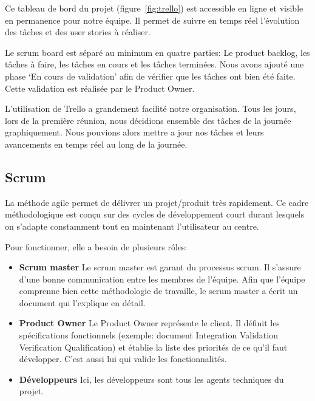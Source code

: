 Ce tableau de bord du projet (figure~\ref{fig:trello}) est accessible en ligne et visible en permanence pour notre équipe.
Il permet de suivre en temps réel l'évolution des tâches et des user stories à réaliser.

Le scrum board est séparé au minimum en quatre parties: Le product backlog, les tâches à faire, les tâches en cours et les tâches terminées.
Nous avons ajouté une phase `En cours de validation' afin de vérifier que les tâches ont bien été faite. 
Cette validation est réalisée par le Product Owner.

L'utilisation de Trello a grandement facilité notre organisation.
Tous les jours, lors de la première réunion, nous décidions ensemble des tâches de la journée graphiquement.
Nous pouvions alors mettre a jour nos tâches et leurs avancements en temps réel au long de la journée.

\subsection{Scrum}
La méthode agile permet de délivrer un projet/produit très rapidement.
Ce cadre méthodologique est conçu sur des cycles de développement court durant lesquels on s'adapte constamment tout en maintenant l'utilisateur au centre. 

Pour fonctionner, elle a besoin de plusieurs rôles:
\begin{itemize}
    \item \textbf{Scrum master}\newline
    Le scrum master est garant du processus scrum.
    Il s'assure d’une bonne communication entre les membres de l'équipe.
    Afin que l'équipe comprenne bien cette méthodologie de travaille, le scrum master a écrit un document qui l'explique en détail.

    \item \textbf{Product Owner}\newline
    Le Product Owner représente le client.
    Il définit les spécifications fonctionnels (exemple:  document Integration Validation Verification Qualification) et établie la liste des priorités de ce qu'il faut développer.
    C'est aussi lui qui valide les fonctionnalités.
    

    \item \textbf{Développeurs}\newline
    Ici, les développeurs sont tous les agents techniques du projet.
\end{itemize}

